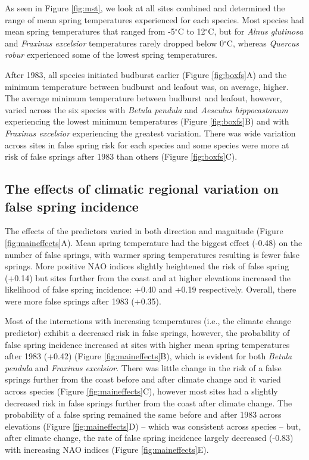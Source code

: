 \documentclass{article}\usepackage[]{graphicx}\usepackage[]{color}
\begin{document}
As seen in Figure \ref{fig:mst}, we look at all sites combined and determined the range of mean spring temperatures experienced for each species.  Most species had mean spring temperatures that ranged from -5$^{\circ}$C to 12$^{\circ}$C, but for \textit{Alnus glutinosa} and \textit{Fraxinus excelsior} temperatures rarely dropped below 0$^{\circ}$C, whereas \textit{Quercus robur} experienced some of the lowest spring temperatures. 

After 1983, all species initiated budburst earlier (Figure \ref{fig:boxfs}A) and the minimum temperature between budburst and leafout was, on average, higher.  The average minimum temperature between budburst and leafout, however, varied across the six species with \textit{Betula pendula} and \textit{Aesculus hippocastanum} experiencing the lowest minimum temperatures (Figure \ref{fig:boxfs}B) and with \textit{Fraxinus excelsior} experiencing the greatest variation. There was wide variation across sites in false spring risk for each species and some species were more at risk of false springs after 1983 than others (Figure \ref{fig:boxfs}C).

\subsection*{The effects of climatic regional variation on false spring incidence}
The effects of the predictors varied in both direction and magnitude (Figure \ref{fig:maineffects}A). Mean spring temperature had the biggest effect (-0.48) on the number of false springs, with warmer spring temperatures resulting is fewer false springs. More positive NAO indices slightly heightened the risk of false spring (+0.14) but sites further from the coast and at higher elevations increased the likelihood of false spring incidence: +0.40 and +0.19 respectively. Overall, there were more false springs after 1983 (+0.35). 

Most of the interactions with increasing temperatures (i.e., the climate change predictor) exhibit a decreased risk in false springs, however, the probability of false spring incidence increased at sites with higher mean spring temperatures after 1983 (+0.42) (Figure \ref{fig:maineffects}B), which is evident for both \textit{Betula pendula} and \textit{Fraxinus excelsior}. There was little change in the risk of a false springs further from the coast before and after climate change and it varied across species (Figure \ref{fig:maineffects}C), however most sites had a slightly decreased risk in false springs further from the coast after climate change. The probability of a false spring remained the same before and after 1983 across elevations (Figure \ref{fig:maineffects}D) -- which was consistent across species -- but, after climate change, the rate of false spring incidence largely decreased (-0.83) with increasing NAO indices (Figure \ref{fig:maineffects}E). 
\end{document}
